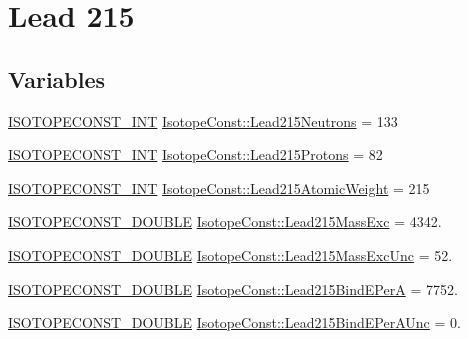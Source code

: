\hypertarget{group___isotope_const-_lead-_pb215}{}\section{Lead 215}
\label{group___isotope_const-_lead-_pb215}
\subsection*{Variables}
\begin{DoxyCompactItemize}
\item 
\mbox{\hyperlink{group___isotope_const-_macros_ga5f18360b3e99483a35c32d789e62621c}{I\+S\+O\+T\+O\+P\+E\+C\+O\+N\+S\+T\+\_\+\+I\+NT}} \mbox{\hyperlink{group___isotope_const-_lead-_pb215_ga8fe09f662765b28c8a13d7430e8fd4ed}{Isotope\+Const\+::\+Lead215\+Neutrons}} = 133
\item 
\mbox{\hyperlink{group___isotope_const-_macros_ga5f18360b3e99483a35c32d789e62621c}{I\+S\+O\+T\+O\+P\+E\+C\+O\+N\+S\+T\+\_\+\+I\+NT}} \mbox{\hyperlink{group___isotope_const-_lead-_pb215_gabae89f3739b099bad7d963e08295a523}{Isotope\+Const\+::\+Lead215\+Protons}} = 82
\item 
\mbox{\hyperlink{group___isotope_const-_macros_ga5f18360b3e99483a35c32d789e62621c}{I\+S\+O\+T\+O\+P\+E\+C\+O\+N\+S\+T\+\_\+\+I\+NT}} \mbox{\hyperlink{group___isotope_const-_lead-_pb215_gad8367665283b654da3c61ec6441e7f59}{Isotope\+Const\+::\+Lead215\+Atomic\+Weight}} = 215
\item 
\mbox{\hyperlink{group___isotope_const-_macros_ga8f45a7272ce02c0b4c65c44636ed719a}{I\+S\+O\+T\+O\+P\+E\+C\+O\+N\+S\+T\+\_\+\+D\+O\+U\+B\+LE}} \mbox{\hyperlink{group___isotope_const-_lead-_pb215_ga0d3ffe99583c91a6e7723ec40b4972db}{Isotope\+Const\+::\+Lead215\+Mass\+Exc}} = 4342.
\item 
\mbox{\hyperlink{group___isotope_const-_macros_ga8f45a7272ce02c0b4c65c44636ed719a}{I\+S\+O\+T\+O\+P\+E\+C\+O\+N\+S\+T\+\_\+\+D\+O\+U\+B\+LE}} \mbox{\hyperlink{group___isotope_const-_lead-_pb215_ga1a59d2d454a7f018c0a2e0c2e9377e04}{Isotope\+Const\+::\+Lead215\+Mass\+Exc\+Unc}} = 52.
\item 
\mbox{\hyperlink{group___isotope_const-_macros_ga8f45a7272ce02c0b4c65c44636ed719a}{I\+S\+O\+T\+O\+P\+E\+C\+O\+N\+S\+T\+\_\+\+D\+O\+U\+B\+LE}} \mbox{\hyperlink{group___isotope_const-_lead-_pb215_gaad1e8cd53ebcb3dbe0f3a369d02d1bae}{Isotope\+Const\+::\+Lead215\+Bind\+E\+PerA}} = 7752.
\item 
\mbox{\hyperlink{group___isotope_const-_macros_ga8f45a7272ce02c0b4c65c44636ed719a}{I\+S\+O\+T\+O\+P\+E\+C\+O\+N\+S\+T\+\_\+\+D\+O\+U\+B\+LE}} \mbox{\hyperlink{group___isotope_const-_lead-_pb215_gad87a3d03741dbe6fdff7a98f54ac50b5}{Isotope\+Const\+::\+Lead215\+Bind\+E\+Per\+A\+Unc}} = 0.

\end{DoxyCompactItemize}
